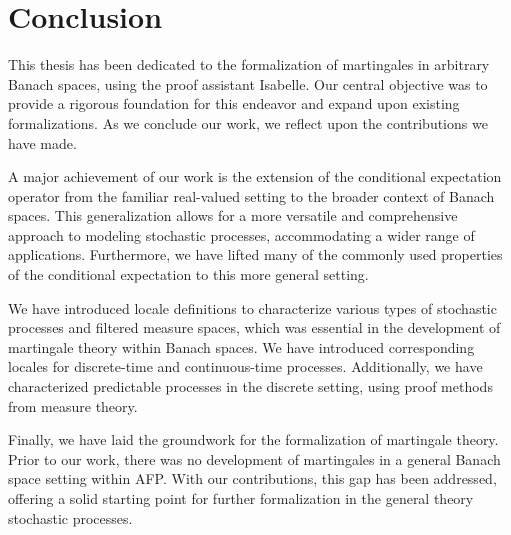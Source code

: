 
\chapter{Conclusion}\label{chapter:conclusion}

This thesis has been dedicated to the formalization of martingales in arbitrary Banach spaces, using the proof assistant Isabelle. Our central objective was to provide a rigorous foundation for this endeavor and expand upon existing formalizations. As we conclude our work, we reflect upon the contributions we have made.

A major achievement of our work is the extension of the conditional expectation operator from the familiar real-valued setting to the broader context of Banach spaces. This generalization allows for a more versatile and comprehensive approach to modeling stochastic processes, accommodating a wider range of applications. Furthermore, we have lifted many of the commonly used properties of the conditional expectation to this more general setting.

We have introduced locale definitions to characterize various types of stochastic processes and filtered measure spaces, which was essential in the development of martingale theory within Banach spaces. We have introduced corresponding locales for discrete-time and continuous-time processes. Additionally, we have characterized predictable processes in the discrete setting, using proof methods from measure theory.

Finally, we have laid the groundwork for the formalization of martingale theory. Prior to our work, there was no development of martingales in a general Banach space setting within \textsf{\ac{AFP}}. With our contributions, this gap has been addressed, offering a solid starting point for further formalization in the general theory stochastic processes.